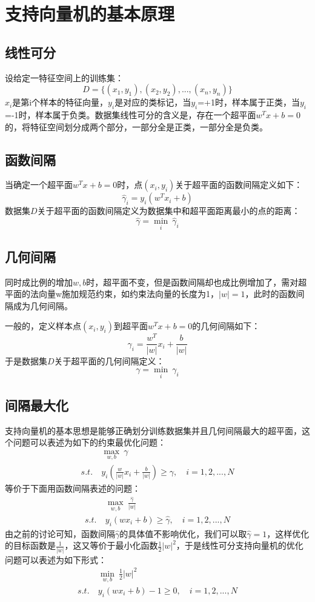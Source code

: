 \chapter{支持向量机的基本原理}
\section{线性可分}
设给定一特征空间上的训练集：
$$ D = \{(x_1, y_1), (x_2, y_2), ..., (x_n, y_n)\}$$
$x_i$是第i个样本的特征向量，$y_i$是对应的类标记，当$y_i$=+1时，样本属于正类，当$y_i$=-1时，样本属于负类。数据集线性可分的含义是，存在一个超平面$w^Tx+b=0$的，将特征空间划分成两个部分，一部分全是正类，一部分全是负类。

\section{函数间隔}
当确定一个超平面$w^Tx+b=0$时，点$(x_i,y_i)$关于超平面的函数间隔定义如下：
$$ \hat\gamma_i = y_i(w^Tx_i    +b) $$
数据集$D$关于超平面的函数间隔定义为数据集中和超平面距离最小的点的距离：
$$ \hat\gamma = \underset{i}{\min}\ \hat\gamma_i $$

\section{几何间隔}
同时成比例的增加$w, b$时，超平面不变，但是函数间隔却也成比例增加了，需对超平面的法向量w施加规范约束，如约束法向量的长度为1，$|w|=1$，此时的函数间隔成为几何间隔。

一般的，定义样本点$(x_i,y_i)$到超平面$w^Tx+b=0$的几何间隔如下：
$$ \gamma_i = \frac{w^T}{|w|}x_i + \frac{b}{|w|} $$
于是数据集$D$关于超平面的几何间隔定义：
$$ \gamma = \underset{i}{\min}\ \gamma_i $$

\section{间隔最大化}
支持向量机的基本思想是能够正确划分训练数据集并且几何间隔最大的超平面，这个问题可以表述为如下的约束最优化问题：
\begin{align*}
    & \underset{w,b}{\max}\ \gamma \\
    s.t.\ & y_i(\frac{w}{|w|} x_i + \frac{b}{|w|}) \ge \gamma, \quad i=1, 2, ..., N
\end{align*}
等价于下面用函数间隔表述的问题：
\begin{align*}
    & \underset{w,b}{\max}\ \frac{\hat\gamma}{|w|} \\
    s.t.\ & y_i(w x_i + b) \ge \hat\gamma, \quad i=1, 2, ..., N
\end{align*}
由之前的讨论可知，函数间隔$\hat\gamma$的具体值不影响优化，我们可以取$\hat\gamma=1$，这样优化的目标函数是$\frac{1}{|w|}$，这又等价于最小化函数$\frac{1}{2}|w|^2$，于是线性可分支持向量机的优化问题可以表述为如下形式：
\begin{align*}
    & \underset{w,b}{\min}\ \frac{1}{2} |w|^2 \\
    s.t.\ & y_i(w x_i + b)-1 \ge 0, \quad i=1, 2, ..., N
\end{align*}

